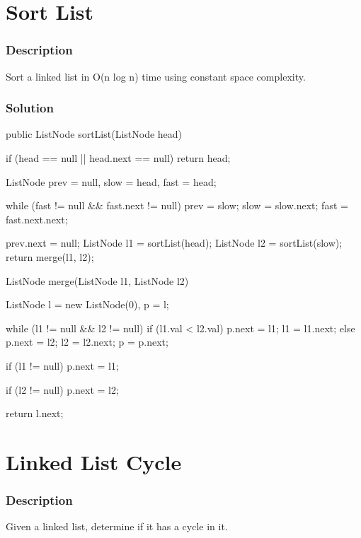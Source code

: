 \newpage

\section{Sort List} %

\subsubsection{Description}
Sort a linked list in O(n log n) time using constant space complexity.

\subsubsection{Solution}

\begin{Code}
public ListNode sortList(ListNode head) {
    if (head == null || head.next == null)
        return head;

    ListNode prev = null, slow = head, fast = head;

    while (fast != null && fast.next != null) {
        prev = slow;
        slow = slow.next;
        fast = fast.next.next;
    }

    prev.next = null;
    ListNode l1 = sortList(head);
    ListNode l2 = sortList(slow);
    return merge(l1, l2);
}

ListNode merge(ListNode l1, ListNode l2) {
    ListNode l = new ListNode(0), p = l;

    while (l1 != null && l2 != null) {
        if (l1.val < l2.val) {
            p.next = l1;
            l1 = l1.next;
        } else {
            p.next = l2;
            l2 = l2.next;
        }
        p = p.next;
    }

    if (l1 != null)
        p.next = l1;

    if (l2 != null)
        p.next = l2;

    return l.next;
}
\end{Code}

\newpage

\section{Linked List Cycle} %

\subsubsection{Description}
Given a linked list, determine if it has a cycle in it.

